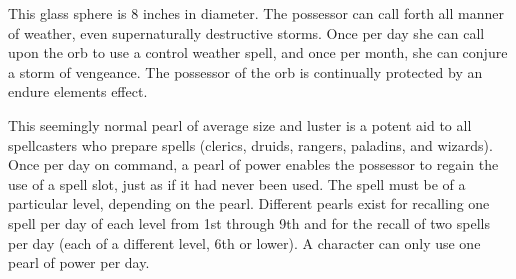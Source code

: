 {\begin{comment}
If the necklace is being worn or carried by a character who fails her saving throw against a magical fire attack, the item must make a saving throw as well (with a save bonus of \plus7). If the necklace fails to save, all its remaining spheres detonate simultaneously, often with regrettable consequences for the wearer.

Moderate evocation; CL 10th; Craft Wondrous Item, fireball.
\end{comment}

  This glass sphere is 8 inches in diameter. The possessor can call forth all manner of weather, even supernaturally destructive storms. Once per day she can call upon the orb to use a control weather spell, and once per month, she can conjure a storm of vengeance. The possessor of the orb is continually protected by an endure elements effect.


 This seemingly normal pearl of average size and luster is a potent aid to all spellcasters who prepare spells (clerics, druids, rangers, paladins, and wizards). Once per day on command, a pearl of power enables the possessor to regain the use of a spell slot, just as if it had never been used. The spell must be of a particular level, depending on the pearl. Different pearls exist for recalling one spell per day of each level from 1st through 9th and for the recall of two spells per day (each of a different level, 6th or lower). A character can only use one pearl of power per day.


\begin{comment}
Pearl of the Sirines} This normal-seeming pearl is beautiful and worth at least 1,000 gp on that basis alone. If it is clasped firmly in hand or held to the breast while the possessor attempts actions related to the pearl's powers, she understands and is able to employ the item.


\end{comment}}
